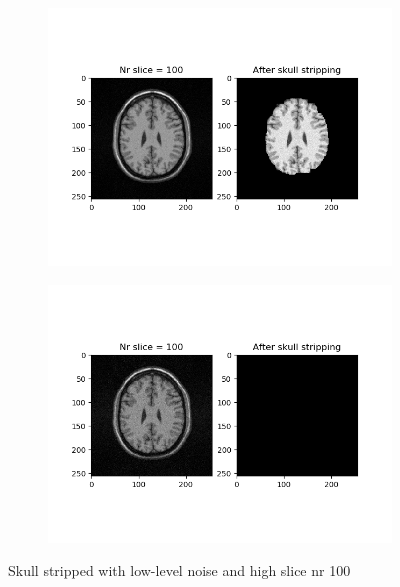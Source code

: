 \begin{figure}[H]
	\centering
	\begin{subfigure}[b]{0.35\linewidth}
		\includegraphics[scale=0.35]{figures/Module_08/M8_11.png}
	\end{subfigure}
		\begin{subfigure}[b]{0.35\linewidth}
		\includegraphics[scale=0.35]{figures/Module_08/M8_n11.png}
	\end{subfigure}
	\caption{Skull stripped with low-level noise and high slice nr 100}
	\label{fig:figures/m08_11}
\end{figure}


